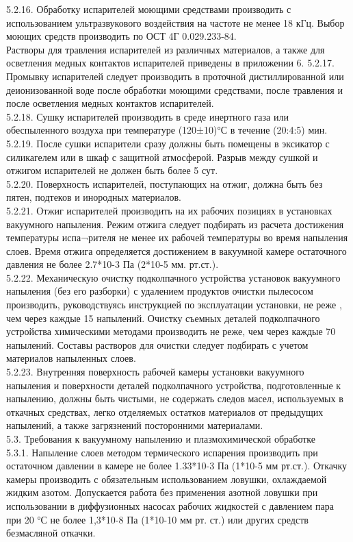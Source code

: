 \documentclass{bmstu}
\begin{document}
	5.2.16. Обработку испарителей моющими средствами производить с использованием ультразвукового воздействия на частоте не менее 18 кГц. Выбор моющих средств производить по ОСТ 4Г 0.029.233-84. \\
	Растворы для травления испарителей из различных материалов, а также для осветления медных контактов испарителей приведены в приложении 6.
	5.2.17. Промывку испарителей следует производить в проточной дистиллированной или деионизованной воде после обработки моющими средствами, после травления и после осветления медных контактов испарителей. \\
	5.2.18. Сушку испарителей производить в среде инертного газа или обеспыленного воздуха при температуре (120±10)°С в течение (20:4:5) мин. \\
	5.2.19. После сушки испарители сразу должны быть помещены в эксикатор с силикагелем или в шкаф с защитной атмосферой. Разрыв между сушкой и отжигом испарителей не должен быть более 5 сут. \\
	5.2.20. Поверхность испарителей, поступающих на отжиг, должна быть без пятен, подтеков и инородных материалов. \\
	5.2.21. Отжиг испарителей производить на их рабочих позициях в установках вакуумного напыления. Режим отжига следует подбирать из расчета достижения температуры испа¬рителя не менее их рабочей температуры во время напыления слоев. Время отжига определяется достижением в вакуумной камере остаточного давления не более 2.7*10-3  Па (2*10-5  мм. рт.ст.). \\
	5.2.22. Механическую очистку подколпачного устройства установок вакуумного напыления (без его разборки) с удалением продуктов очистки пылесосом производить, руководствуясь инструкцией по эксплуатации установки, не реже , чем через каждые 15 напылений. Очистку съемных деталей подколпачного устройства химическими методами производить не реже, чем через каждые 70 напылений. Составы растворов для очистки следует подбирать с учетом материалов напыленных слоев. \\
	5.2.23. Внутренняя поверхность рабочей камеры установки вакуумного напыления и поверхности деталей подколпачного устройства, подготовленные к напылению, должны быть чистыми,  не содержать следов  масел,  используемых в откачных средствах, легко отделяемых остатков материалов от предыдущих напылений, а также загрязнений посторонними материалами. \\
	5.3. Требования к вакуумному напылению и плазмохимической обработке \\
	5.3.1. Напыление слоев методом термического испарения производить при остаточном давлении в камере не более 1.33*10-3 Па (1*10-5 мм рт.ст.). Откачку камеры производить с обязательным использованием ловушки, охлаждаемой жидким азотом. Допускается работа без применения азотной ловушки при использовании в диффузионных насосах рабочих жидкостей с давлением пара при 20 °С не более 1,3*10-8  Па  (1*10-10  мм рт. ст.) или других средств безмасляной откачки. \\
\end{document}
